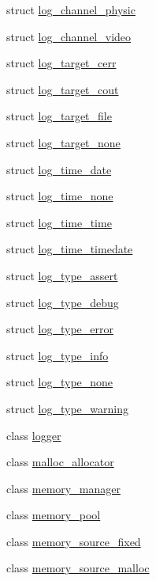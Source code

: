 \begin{DoxyCompactItemize}
struct \hyperlink{structcrap_1_1log__channel__physic}{log\+\_\+channel\+\_\+physic}
\item 
struct \hyperlink{structcrap_1_1log__channel__video}{log\+\_\+channel\+\_\+video}
\item 
struct \hyperlink{structcrap_1_1log__target__cerr}{log\+\_\+target\+\_\+cerr}
\item 
struct \hyperlink{structcrap_1_1log__target__cout}{log\+\_\+target\+\_\+cout}
\item 
struct \hyperlink{structcrap_1_1log__target__file}{log\+\_\+target\+\_\+file}
\item 
struct \hyperlink{structcrap_1_1log__target__none}{log\+\_\+target\+\_\+none}
\item 
struct \hyperlink{structcrap_1_1log__time__date}{log\+\_\+time\+\_\+date}
\item 
struct \hyperlink{structcrap_1_1log__time__none}{log\+\_\+time\+\_\+none}
\item 
struct \hyperlink{structcrap_1_1log__time__time}{log\+\_\+time\+\_\+time}
\item 
struct \hyperlink{structcrap_1_1log__time__timedate}{log\+\_\+time\+\_\+timedate}
\item 
struct \hyperlink{structcrap_1_1log__type__assert}{log\+\_\+type\+\_\+assert}
\item 
struct \hyperlink{structcrap_1_1log__type__debug}{log\+\_\+type\+\_\+debug}
\item 
struct \hyperlink{structcrap_1_1log__type__error}{log\+\_\+type\+\_\+error}
\item 
struct \hyperlink{structcrap_1_1log__type__info}{log\+\_\+type\+\_\+info}
\item 
struct \hyperlink{structcrap_1_1log__type__none}{log\+\_\+type\+\_\+none}
\item 
struct \hyperlink{structcrap_1_1log__type__warning}{log\+\_\+type\+\_\+warning}
\item 
class \hyperlink{singletoncrap_1_1logger}{logger}
\item 
class \hyperlink{classcrap_1_1malloc__allocator}{malloc\+\_\+allocator}
\item 
class \hyperlink{classcrap_1_1memory__manager}{memory\+\_\+manager}
\item 
class \hyperlink{classcrap_1_1memory__pool}{memory\+\_\+pool}
\item 
class \hyperlink{classcrap_1_1memory__source__fixed}{memory\+\_\+source\+\_\+fixed}
\item 
class \hyperlink{classcrap_1_1memory__source__malloc}{memory\+\_\+source\+\_\+malloc}

\end{DoxyCompactItemize}
